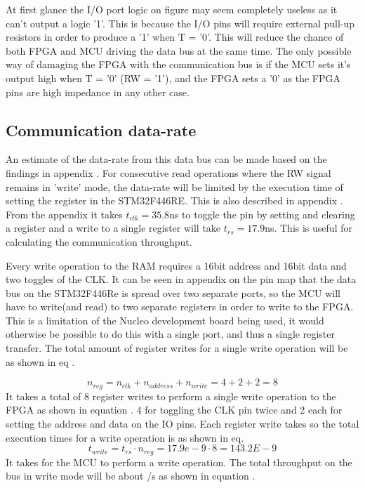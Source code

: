 At first glance the I/O port logic on figure  may seem completely useless as it can't output a logic '1'. This is because the I/O pins will require external pull-up resistors in order to produce a '1' when T = '0'. This will reduce the chance of both FPGA and MCU driving the data bus at the same time. The only possible way of damaging the FPGA with the communication bus is if the MCU sets it's output high when T = '0' (RW = '1'), and the FPGA sets a '0' as the FPGA pins are high impedance in any other case.

\subsection*{Communication data-rate} \label{subsubsec:CommunicationDatarate}

An estimate of the data-rate from this data bus can be made based on the findings in appendix . For consecutive read operations where the RW signal remains in 'write' mode, the data-rate will be limited by the execution time of setting the register in the STM32F446RE. This is also described in appendix . From the appendix it takes $t_{clk} = 35.8$ns to toggle the pin by setting and clearing a register and a write to a single register will take $t_{rs} = 17.9$ns. This is useful for calculating the communication throughput.

Every write operation to the RAM requires a 16bit address and 16bit data and two toggles of the CLK. It can be seen in appendix  on the pin map that the data bus on the STM32F446Re is spread over two separate ports, so the MCU will have to write(and read) to two separate registers in order to write to the FPGA. This is a limitation of the Nucleo development board being used, it would otherwise be possible to do this with a single port, and thus a single register transfer. The total amount of register writes for a single write operation will be as shown in eq .

\begin{equation}\label{eq:7_2_1_Write_ThroughPut}
    n_{reg} = n_{clk} +  n_{address} + n_{write} = 4+2+2 = 8 
\end{equation}
It takes a total of 8 register writes to perform a single write operation to the FPGA as shown in equation . 4 for toggling the CLK pin twice and 2 each for setting the address and data on the IO pins. Each register write takes  so the total execution times for a write operation is  as shown in eq.
\begin{equation}\label{eq:7_2_1_Write_ThroughPutTotalTime}
    t_{write} = t_{rs} \cdot n_{reg} = 17.9e-9 \cdot 8 =  143.2E-9
\end{equation}
It takes  for the MCU to perform a write operation. The total throughput on the bus in write mode will be about /s as shown in equation .

